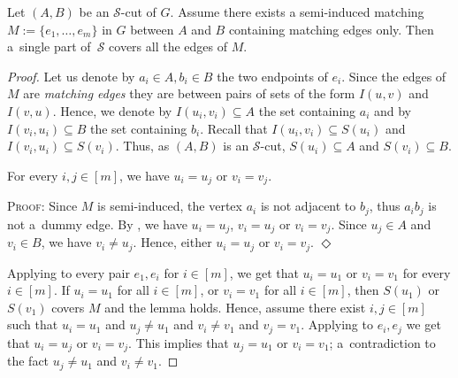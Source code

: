 \documentclass[a4paper,UKenglish,cleveref,hyperref,autoref]{lipics-v2021}
\newenvironment{proofofclaim}{\noindent \textsc{Proof:}}{\hfill$\Diamond$\medskip}
\begin{document}
\begin{lemma}\label{lem:matching-edges-are-clean}
  Let $(A, B)$ be an $\mathcal S$-cut of $G$.
  Assume there exists a semi-induced matching $M := \{e_1, \dots, e_m\}$ in $G$ between $A$ and $B$ containing matching edges only.
  Then a~single part of~$\mathcal S$ covers all the edges of $M$. 
\end{lemma}
\begin{proof}
  Let us denote by $a_i \in A, b_i \in B$ the two endpoints of $e_i$.
  Since the edges of $M$ are \emph{matching edges} they are between pairs of sets of the form $I(u, v)$ and $I(v, u)$.
  Hence, we denote by $I(u_i, v_i) \subseteq A$ the set containing $a_i$ and by $I(v_i, u_i) \subseteq B$ the set containing $b_i$.
  Recall that $I(u_i, v_i) \subseteq S(u_i)$ and  $I(v_i, u_i) \subseteq S(v_i)$.
  Thus, as $(A, B)$ is an $\mathcal S$-cut, $S(u_i) \subseteq A$ and $S(v_i) \subseteq B$.
  \begin{claim}\label{cl:proof-matching-edges-are-clean}
    For every $i,j\in [m]$, we have $u_i = u_j$ or $v_i = v_j$.
\end{claim}
  \begin{proofofclaim}
    Since $M$ is semi-induced, the vertex $a_i$ is not adjacent to $b_j$, thus $a_ib_j$ is not a~dummy edge.
    By , we have $u_i = u_j$, $v_i = u_j$ or $v_i=v_j$.
    Since $u_j \in A$ and $v_i \in B$, we have $v_i \neq u_j$.
    Hence, either $u_i = u_j$ or $v_i = v_j$.
  \end{proofofclaim}

  Applying  to every pair $e_1, e_i$ for $i \in [m]$, we get that $u_i = u_1$ or $v_i = v_1$ for every $i\in [m]$.
  If $u_i = u_1$ for all $i\in [m]$, or $v_i = v_1$ for all $i\in [m]$, then $S(u_1)$ or $S(v_1)$ covers $M$ and the lemma holds.
  Hence, assume there exist $i,j\in [m]$ such that $u_i = u_1$ and $u_j\neq u_1$ and $v_i \neq v_1$ and $v_j = v_1$.
  Applying  to $e_i, e_j$ we get that $u_i = u_j$ or $v_i = v_j$.
  This implies that $u_j = u_1$ or $v_i = v_1$; a~contradiction to the fact $u_j \neq u_1$ and $v_i\neq v_1$.
\end{proof}
\end{document}
